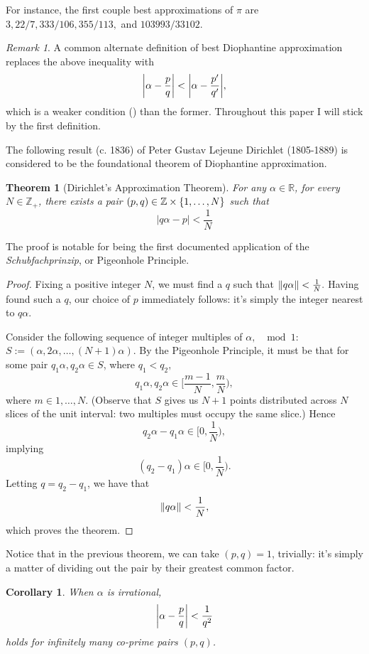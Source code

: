 \documentclass[12pt, letterpaper, oneside]{book}
\newcommand{\ga}{\ensuremath{\alpha}}
\newcommand{\R}{\mathbb{R}}
\newcommand{\Z}{\mathbb{Z}}
\DeclarePairedDelimiter{\abs}{\lvert}{\rvert}
\DeclarePairedDelimiter{\norm}{\lVert}{\rVert}
\DeclarePairedDelimiter{\set}{\lbrace}{\rbrace}
\theoremstyle{plain}
\newtheorem{theorem}{Theorem}
\newtheorem{corollary}{Corollary}
\theoremstyle{definition}
\theoremstyle{remark}
\newtheorem*{remark}{Remark}
\begin{document}
For instance, the first couple best approximations of $\pi$ are $3, 22/7, 333/106, 355/113,$ and $103993 / 33102.$ 

\begin{remark} A common alternate definition of best Diophantine approximation replaces the above inequality with
\[
\abs*{\ga - \frac{p}{q}}<\abs*{\ga - \frac{p'}{q'}},
\]
which is a weaker condition (\cite{AMR92}) than the former. Throughout this paper I will stick by the first definition. 
\end{remark}



The following result (c. 1836) of Peter Gustav Lejeune Dirichlet (1805-1889) is considered to be the foundational theorem of Diophantine approximation. 

\begin{theorem}[Dirichlet's Approximation Theorem]
  For any $\ga \in \R$, for every $N \in \Z _{+}$, there exists a pair
  $(p,q) \in \Z \times \set{1,\ldots,N}$ such that
  \[|q\ga - p| < \frac{1}{N}\]
\end{theorem}

The proof is notable for being the first documented application of the
\textit{Schubfachprinzip}, or Pigeonhole Principle.

\begin{proof}
  Fixing a positive integer $N$, we must find a $q$ such that
  $\norm{q\ga} < \frac{1}{N}.$ Having found such
  a $q$, our choice of $p$ immediately follows: it's
  simply the integer nearest to $q\ga$.

Consider the following sequence of integer multiples of $\ga,$ $\mod 1$: $S:= (\ga, 2\ga, \ldots, (N+1)\ga).$
By the Pigeonhole Principle, it must be that for some pair $q_1\ga, q_2\ga \in S$, where $q_1 < q_2,$ 
  \[
  q_1\ga, q_2\ga \in \Big[\frac{m-1}{N}, \frac{m}{N}\Big),
  \]
  where $m \in {1,\ldots,N}$. (Observe that $S$ gives us $N+1$ points
  distributed across $N$ slices of the unit interval: two multiples
  must occupy the same slice.) Hence
  \[
  q_2\ga - q_1\ga \in \Big[0, \frac{1}{N}\Big),
  \]
  implying 
  \[
  (q_2 - q_1)\ga \in \Big[0, \frac{1}{N}\Big).
  \]
  Letting $q = q_2 - q_1$, we have that
  \[\norm{q\ga} < \frac{1}{N},\]
  which proves the theorem.
\end{proof}

Notice that in the previous theorem, we can take $(p,q)=1$,
trivially: it's simply a matter of dividing out the pair by their greatest common factor.

\begin{corollary}
  When $\ga$ is irrational,
  \[ 
  \abs*{\ga - \frac{p}{q}} <\frac{1}{q^2}
  \]
  holds for infinitely many co-prime pairs $(p,q)$.
\end{corollary}
\end{document}

